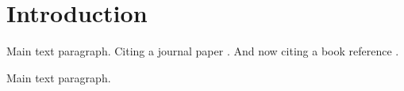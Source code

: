 \section{Introduction}


Main text paragraph. Citing a journal paper \cite{ref-journal}. And now citing a book reference \cite{ref-book}.


Main text paragraph.
